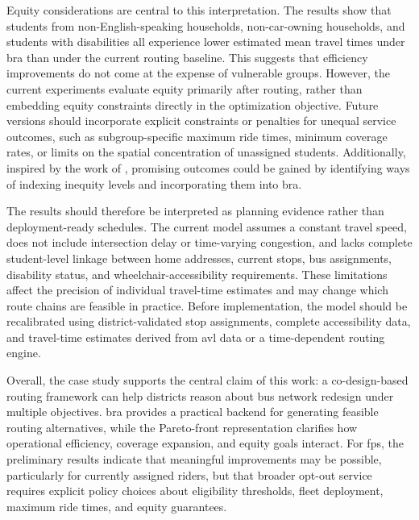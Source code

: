 Equity considerations are central to this interpretation. The results show that students from non-English-speaking households, non-car-owning households, and students with disabilities all experience lower estimated mean travel times under \gls{bra} than under the current routing baseline. This suggests that efficiency improvements do not come at the expense of vulnerable groups. However, the current experiments evaluate equity primarily after routing, rather than embedding equity constraints directly in the optimization objective. Future versions should incorporate explicit constraints or penalties for unequal service outcomes, such as subgroup-specific maximum ride times, minimum coverage rates, or limits on the spatial concentration of unassigned students. Additionally, inspired by the work of \textcite{vanweeEvaluatingTransportEquity2021}, promising outcomes could be gained by identifying ways of indexing inequity levels and incorporating them into \gls{bra}.

The results should therefore be interpreted as planning evidence rather than deployment-ready schedules. The current model assumes a constant travel speed, does not include intersection delay or time-varying congestion, and lacks complete student-level linkage between home addresses, current stops, bus assignments, disability status, and wheelchair-accessibility requirements. These limitations affect the precision of individual travel-time estimates and may change which route chains are feasible in practice. Before implementation, the model should be recalibrated using district-validated stop assignments, complete accessibility data, and travel-time estimates derived from \gls{avl} data or a time-dependent routing engine.

Overall, the case study supports the central claim of this work: a co-design-based routing framework can help districts reason about bus network redesign under multiple objectives. \Gls{bra} provides a practical backend for generating feasible routing alternatives, while the Pareto-front representation clarifies how operational efficiency, coverage expansion, and equity goals interact. For \gls{fps}, the preliminary results indicate that meaningful improvements may be possible, particularly for currently assigned riders, but that broader opt-out service requires explicit policy choices about eligibility thresholds, fleet deployment, maximum ride times, and equity guarantees.

